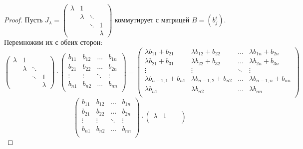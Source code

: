\begin{proof}
    Пусть
    $
    J_\lambda =
    \begin{pmatrix}
        \lambda & 1 & & \\
         & \lambda & \ddots & \\
         & & \ddots & 1 \\
         & & & \lambda
    \end{pmatrix}
    $ коммутирует с матрицей $B = (b^i_j)$. Перемножим их с обеих сторон:
    \[
    \begin{pmatrix}
        \lambda & 1 & & \\
         & \lambda & \ddots & \\
         & & \ddots & 1 \\
         & & & \lambda
    \end{pmatrix} \cdot
    \begin{pmatrix}
        b_{11} & b_{12} & \ldots & b_{1n}\\
        b_{21} & b_{22} & \ldots & b_{2n}\\
        \vdots & \vdots & \ddots & \vdots\\
        b_{n1} & b_{n2} & \ldots & b_{nn}\\
    \end{pmatrix} =
    \begin{pmatrix}
        \lambda b_{11} + b_{21} & \lambda b_{12} + b_{22} & \ldots & \lambda b_{1n} + b_{2n}\\
        \lambda b_{21} + b_{31} & \lambda b_{22} + b_{32} & \ldots & \lambda b_{2n} + b_{3n}\\
        \vdots & \vdots & \ddots & \vdots\\
        \lambda b_{n - 1, 1} + b_{n1} & \lambda b_{n - 1, 2} + b_{n2} & \ldots & \lambda b_{n - 1, n} + b_{nn}\\
        \lambda b_{n1} & \lambda b_{n2} & \ldots & \lambda b_{nn}\\
    \end{pmatrix}
    \]
    \[
    \begin{pmatrix}
        b_{11} & b_{12} & \ldots & b_{1n}\\
        b_{21} & b_{22} & \ldots & b_{2n}\\
        \vdots & \vdots & \ddots & \vdots\\
        b_{n1} & b_{n2} & \ldots & b_{nn}\\
    \end{pmatrix} \cdot
    \begin{pmatrix}
        \lambda & 1 & & \\

\end{pmatrix}\]
\end{proof}
